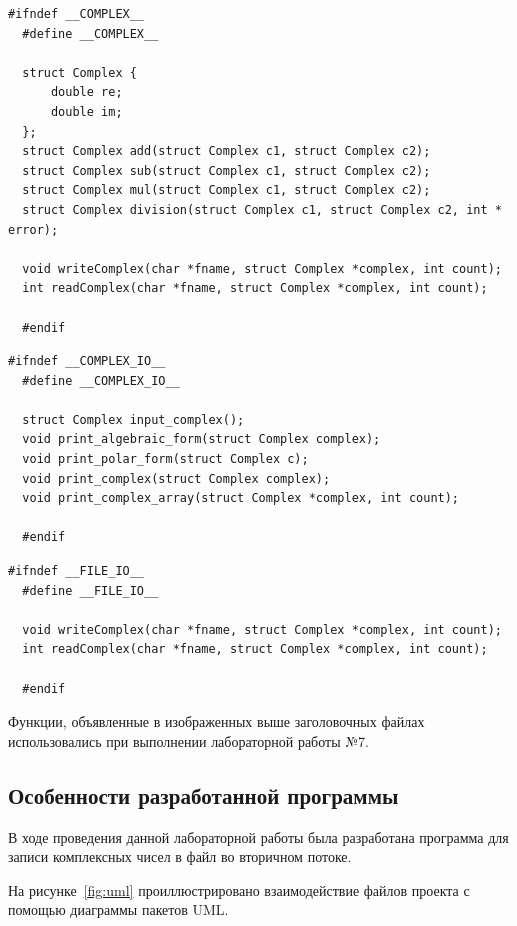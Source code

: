 \begin{lstlisting}[caption=Исходный код заколовочного файла complex.h,label=lst:complex_h_code]
  #ifndef __COMPLEX__
  #define __COMPLEX__

  struct Complex {
      double re;
      double im;
  };
  struct Complex add(struct Complex c1, struct Complex c2);
  struct Complex sub(struct Complex c1, struct Complex c2);
  struct Complex mul(struct Complex c1, struct Complex c2);
  struct Complex division(struct Complex c1, struct Complex c2, int * error);

  void writeComplex(char *fname, struct Complex *complex, int count);
  int readComplex(char *fname, struct Complex *complex, int count);

  #endif
\end{lstlisting}

\begin{lstlisting}[caption=Исходный код заколовочного файла complex\_io.h,label=lst:complex_io_h_code]
  #ifndef __COMPLEX_IO__
  #define __COMPLEX_IO__

  struct Complex input_complex();
  void print_algebraic_form(struct Complex complex);
  void print_polar_form(struct Complex c);
  void print_complex(struct Complex complex);
  void print_complex_array(struct Complex *complex, int count);

  #endif
\end{lstlisting}

\begin{lstlisting}[caption=Исходный код заколовочного файла file\_io.h,label=lst:file_io_h_code]
  #ifndef __FILE_IO__
  #define __FILE_IO__

  void writeComplex(char *fname, struct Complex *complex, int count);
  int readComplex(char *fname, struct Complex *complex, int count);

  #endif
\end{lstlisting}

Функции, объявленные в изображенных выше заголовочных файлах использовались при выполнении лабораторной работы №7.

\subsection{Особенности разработанной программы}

В ходе проведения данной лабораторной работы была разработана программа для записи комплексных чисел в файл во вторичном потоке.

На рисунке~\ref{fig:uml} проиллюстрировано взаимодействие файлов проекта с помощью диаграммы пакетов UML.

